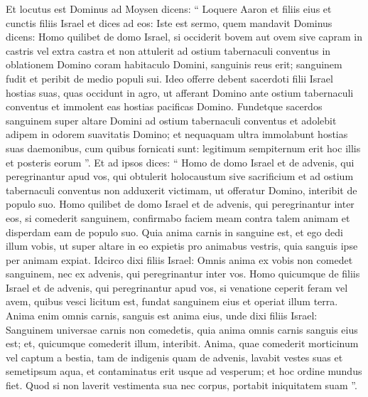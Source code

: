 \begin{biblechapter}
\begin{biblechapter}
\begin{biblechapter}
\begin{biblechapter}
\begin{biblechapter}
\begin{biblechapter}
\begin{biblechapter}
\begin{biblechapter}
\begin{biblechapter}
\begin{biblechapter}
\begin{biblechapter}
\begin{biblechapter}
\begin{biblechapter}
\begin{biblechapter}
\begin{biblechapter}
\begin{biblechapter}
\begin{biblechapter}
\verse Et locutus est Dominus ad Moysen dicens: 
\verse “ Loquere Aaron et filiis eius et cunctis filiis Israel et dices ad eos: Iste est sermo, quem mandavit Dominus dicens: 
\verse Homo quilibet de domo Israel, si occiderit bovem aut ovem sive capram in castris vel extra castra 
\verse et non attulerit ad ostium tabernaculi conventus in oblationem Domino coram habitaculo Domini, sanguinis reus erit; sanguinem fudit et peribit de medio populi sui. 
\verse Ideo offerre debent sacerdoti filii Israel hostias suas, quas occidunt in agro, ut afferant Domino ante ostium tabernaculi conventus et immolent eas hostias pacificas Domino. 
\verse Fundetque sacerdos sanguinem super altare Domini ad ostium tabernaculi conventus et adolebit adipem in odorem suavitatis Domino; 
\verse et nequaquam ultra immolabunt hostias suas daemonibus, cum quibus fornicati sunt: legitimum sempiternum erit hoc illis et posteris eorum ”.
 \verse Et ad ipsos dices: “ Homo de domo Israel et de advenis, qui peregrinantur apud vos, qui obtulerit holocaustum sive sacrificium 
\verse et ad ostium tabernaculi conventus non adduxerit victimam, ut offeratur Domino, interibit de populo suo.
 \verse Homo quilibet de domo Israel et de advenis, qui peregrinantur inter eos, si comederit sanguinem, confirmabo faciem meam contra talem animam et disperdam eam de populo suo. 
\verse Quia anima carnis in sanguine est, et ego dedi illum vobis, ut super altare in eo expietis pro animabus vestris, quia sanguis ipse per animam expiat. 
\verse Idcirco dixi filiis Israel: Omnis anima ex vobis non comedet sanguinem, nec ex advenis, qui peregrinantur inter vos.
 \verse Homo quicumque de filiis Israel et de advenis, qui peregrinantur apud vos, si venatione ceperit feram vel avem, quibus vesci licitum est, fundat sanguinem eius et operiat illum terra. 
\verse Anima enim omnis carnis, sanguis est anima eius, unde dixi filiis Israel: Sanguinem universae carnis non comedetis, quia anima omnis carnis sanguis eius est; et, quicumque comederit illum, interibit.
 \verse Anima, quae comederit morticinum vel captum a bestia, tam de indigenis quam de advenis, lavabit vestes suas et semetipsum aqua, et contaminatus erit usque ad vesperum; et hoc ordine mundus fiet. 
\verse Quod si non laverit vestimenta sua nec corpus, portabit iniquitatem suam ”.
 

\end{biblechapter}
\end{biblechapter}
\end{biblechapter}
\end{biblechapter}
\end{biblechapter}
\end{biblechapter}
\end{biblechapter}
\end{biblechapter}
\end{biblechapter}
\end{biblechapter}
\end{biblechapter}
\end{biblechapter}
\end{biblechapter}
\end{biblechapter}
\end{biblechapter}
\end{biblechapter}
\end{biblechapter}
